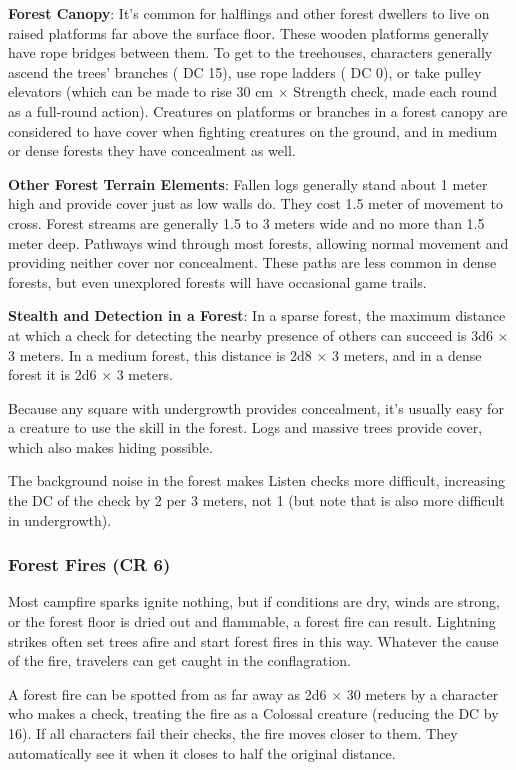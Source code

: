 \textbf{Forest Canopy}: It's common for halflings and other forest dwellers to live on raised platforms far above the surface floor. These wooden platforms generally have rope bridges between them. To get to the treehouses, characters generally ascend the trees' branches ( DC 15), use rope ladders ( DC 0), or take pulley elevators (which can be made to rise 30 cm $\times$ Strength check, made each round as a full-round action). Creatures on platforms or branches in a forest canopy are considered to have cover when fighting creatures on the ground, and in medium or dense forests they have concealment as well.

\textbf{Other Forest Terrain Elements}: Fallen logs generally stand about 1 meter high and provide cover just as low walls do. They cost 1.5 meter of movement to cross. Forest streams are generally 1.5 to 3 meters wide and no more than 1.5 meter deep. Pathways wind through most forests, allowing normal movement and providing neither cover nor concealment. These paths are less common in dense forests, but even unexplored forests will have occasional game trails.

\textbf{Stealth and Detection in a Forest}: In a sparse forest, the maximum distance at which a  check for detecting the nearby presence of others can succeed is 3d6 $\times$ 3 meters. In a medium forest, this distance is 2d8 $\times$ 3 meters, and in a dense forest it is 2d6 $\times$ 3 meters.

Because any square with undergrowth provides concealment, it's usually easy for a creature to use the  skill in the forest. Logs and massive trees provide cover, which also makes hiding possible.

The background noise in the forest makes Listen checks more difficult, increasing the DC of the check by 2 per 3 meters, not 1 (but note that  is also more difficult in undergrowth).

\subsubsection{Forest Fires (CR 6)}
Most campfire sparks ignite nothing, but if conditions are dry, winds are strong, or the forest floor is dried out and flammable, a forest fire can result. Lightning strikes often set trees afire and start forest fires in this way. Whatever the cause of the fire, travelers can get caught in the conflagration.

A forest fire can be spotted from as far away as 2d6 $\times$ 30 meters by a character who makes a  check, treating the fire as a Colossal creature (reducing the DC by 16). If all characters fail their  checks, the fire moves closer to them. They automatically see it when it closes to half the original distance.

